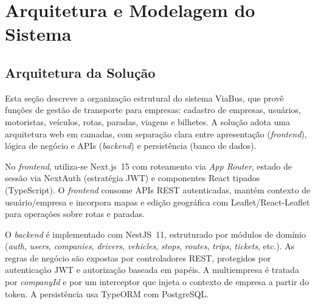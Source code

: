 \chapter{Arquitetura e Modelagem do Sistema} \label{cha:arquitetura}

\section{Arquitetura da Solução}
Esta seção descreve a organização estrutural do sistema ViaBus, que provê funções de gestão de transporte para empresas: cadastro de empresas, usuários, motoristas, veículos, rotas, paradas, viagens e bilhetes. A solução adota uma arquitetura web em camadas, com separação clara entre apresentação (\textit{frontend}), lógica de negócio e APIs (\textit{backend}) e persistência (banco de dados).

No \textit{frontend}, utiliza-se Next.js~15 com roteamento via \textit{App Router}, estado de sessão via NextAuth (estratégia JWT) e componentes React tipados (TypeScript). O \textit{frontend} consome APIs REST autenticadas, mantém contexto de usuário/empresa e incorpora mapas e edição geográfica com Leaflet/React-Leaflet para operações sobre rotas e paradas.

O \textit{backend} é implementado com NestJS~11, estruturado por módulos de domínio (\textit{auth}, \textit{users}, \textit{companies}, \textit{drivers}, \textit{vehicles}, \textit{stops}, \textit{routes}, \textit{trips}, \textit{tickets}, etc.). As regras de negócio são expostas por controladores REST, protegidos por autenticação JWT e autorização baseada em papéis. A multiempresa é tratada por \textit{companyId} e por um interceptor que injeta o contexto de empresa a partir do token. A persistência usa TypeORM com PostgreSQL.

